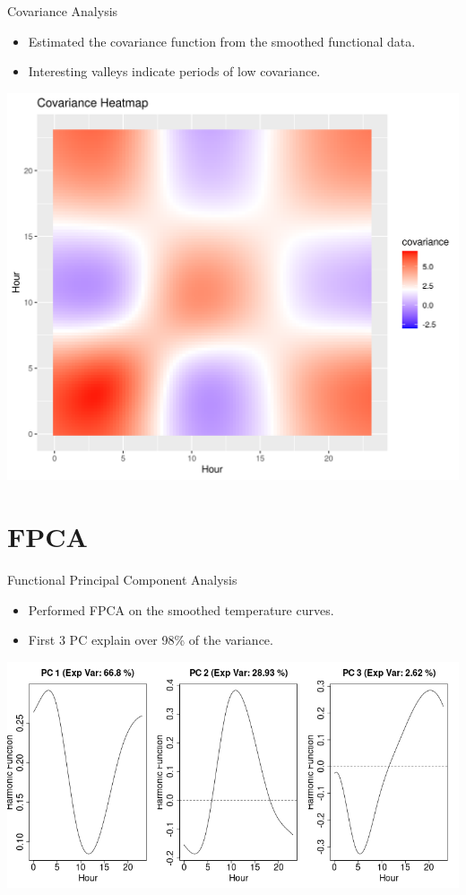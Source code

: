 \documentclass[svgnames, 12pt]{beamer}
\begin{document}
\begin{frame}{Covariance Analysis}
		\begin{itemize}
		\item Estimated the covariance function from the smoothed functional data.
		\item Interesting valleys indicate periods of low covariance.
	\end{itemize}
	\begin{center}
		\includegraphics[width=0.6\linewidth]{../notebooks/assets/covariance_heatmap.png}
	\end{center}
\end{frame}

\section{FPCA}

\begin{frame}{Functional Principal Component Analysis}
	\begin{itemize}
		\item Performed FPCA on the smoothed temperature curves.
		\item First 3 PC explain over 98\% of the variance.
	\end{itemize}
	\begin{center}
		\includegraphics[width=0.8\linewidth]{../notebooks/assets/pca_scree_plot.png}
	\end{center}
\end{frame}
\end{document}
